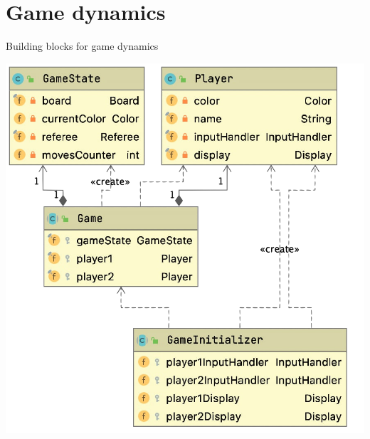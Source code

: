 \documentclass{beamer}
\begin{document}
\section{Game dynamics}


\begin{frame}{Building blocks for game dynamics}
   \begin{center}
       \includegraphics[scale=0.25]{images/game_uml.png}
      \end{center}

\end{frame}
\end{document}
